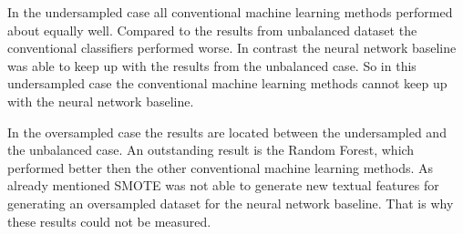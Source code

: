 In the undersampled case all conventional machine learning methods performed about equally well. Compared to the results from unbalanced dataset the conventional classifiers performed worse. In contrast the neural network baseline was able to keep up with the results from the unbalanced case. So in this undersampled case the conventional machine learning methods cannot keep up with the neural network baseline.

In the oversampled case the results are located between the undersampled and the unbalanced case. An outstanding result is the Random Forest, which performed better then the other conventional machine learning methods. As already mentioned SMOTE was not able to generate new textual features for generating an oversampled dataset for the neural network baseline. That is why these results could not be measured.
